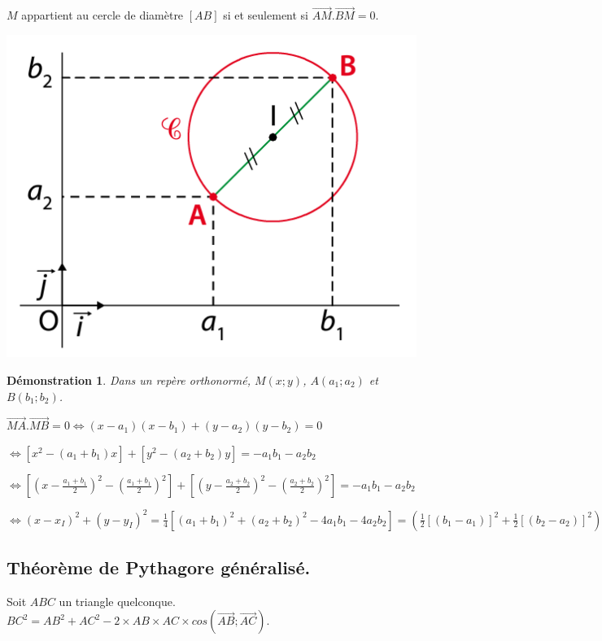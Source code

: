 \documentclass[a4paper,11pt]{article}
\theoremstyle{break}
\newcounter{enonce}
\newtheorem{demonstration}[enonce]{Démonstration}
\begin{document}
\begin{theorem}
 $M$ appartient au cercle de diamètre $[AB]$ si et seulement si $\vec{AM}.\vec{BM}=0$.
 
      \begin{center}
    \includegraphics[scale=0.5]{../Images/cercleDiametre.png}
  \end{center}
\end{theorem}

\begin{demonstration}
 Dans un repère orthonormé, $M(x;y)$, $A(a_1;a_2)$ et $B(b_1;b_2)$.
 
 $\vec{MA}.\vec{MB}=0 \Leftrightarrow (x-a_1)(x-b_1)+(y-a_2)(y-b_2)=0$
 
 $\Leftrightarrow [x^2-(a_1+b_1)x]+[y^2-(a_2+b_2)y]=-a_1b_1-a_2b_2$
 
 $\Leftrightarrow [(x-\frac{a_1+b_1}{2})^2-(\frac{a_1+b_1}{2})^2]+[(y-\frac{a_2+b_2}{2})^2-(\frac{a_2+b_2}{2})^2]=-a_1b_1-a_2b_2$
 
 $\Leftrightarrow (x-x_I)^2+(y-y_I)^2=\frac{1}{4}[(a_1+b_1)^2+(a_2+b_2)^2-4a_1b_1-4a_2b_2]=(\frac{1}{2}[(b_1-a_1)]^2+\frac{1}{2}[(b_2-a_2)]^2)=(\frac{AB}{2})^2$
\end{demonstration}


\newpage

\subsection{Théorème de Pythagore généralisé.}

\begin{theorem}
 Soit $ABC$ un triangle quelconque. $BC^2=AB^2+AC^2-2 \times AB\times AC\times cos(\vec{AB};\vec{AC})$.
 
\end{theorem}
\end{document}
